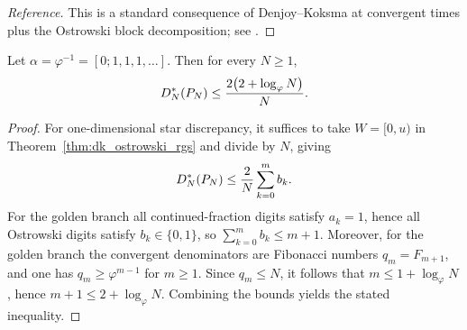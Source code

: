 \begin{proof}[Reference]
This is a standard consequence of Denjoy--Koksma at convergent times plus the Ostrowski block decomposition; see \cite{Denjoy1932,Koksma1935,KatokHasselblatt1995}.
\end{proof}

\begin{corollary}
\label{cor:golden_discrepancy_bound}
Let $\alpha=\varphi^{-1}=[0;1,1,1,\dots]$.
Then for every $N\ge 1$,
\[
D_N^\ast(P_N)\le \frac{2\bigl(2+\log_\varphi N\bigr)}{N}.
\]
\end{corollary}

\begin{proof}
For one-dimensional star discrepancy, it suffices to take $W=[0,u)$ in Theorem~\ref{thm:dk_ostrowski_rgs} and divide by $N$, giving
\[
D_N^\ast(P_N)\le \frac{2}{N}\sum_{k=0}^{m} b_k.
\]
For the golden branch all continued-fraction digits satisfy $a_k=1$, hence all Ostrowski digits satisfy $b_k\in\{0,1\}$, so $\sum_{k=0}^{m} b_k\le m+1$.
Moreover, for the golden branch the convergent denominators are Fibonacci numbers $q_m=F_{m+1}$, and one has $q_m\ge \varphi^{m-1}$ for $m\ge 1$.
Since $q_m\le N$, it follows that $m\le 1+\log_\varphi N$, hence $m+1\le 2+\log_\varphi N$.
Combining the bounds yields the stated inequality.
\end{proof}


